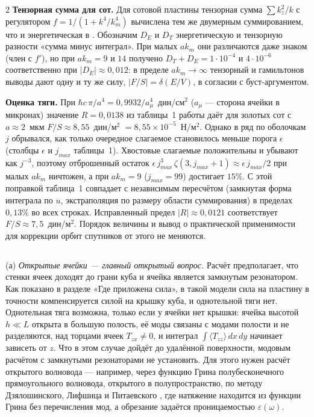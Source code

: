 \documentclass[twoside, 10pt]{article}
\def\myvspacebeforesubsection{-2.0mm}
\def\myvspaceaftersubsection{-2.5mm}
\begin{document}
\begin{multicols}{2}
\textbf{Тензорная сумма для сот.} Для сотовой пластины тензорная сумма \(\sum k_z^2/k\) с
регулятором \(f=1/(1+k^4/k_m^4)\) вычислена тем же двумерным суммированием, что и энергетическая
в \cite{Drozdov2024}. Обозначим \(D_E\) и \(D_T\) энергетическую и тензорную разности
«сумма минус интеграл». При малых \(ak_m\) они различаются даже знаком (член с \(f'\)), но при
\(ak_m=9\) и \(14\) получено \(D_T+D_E=1\cdot10^{-4}\) и \(4\cdot10^{-6}\) соответственно при
\(|D_E|\approx0{,}012\): в пределе \(ak_m\to\infty\) тензорный и гамильтонов выводы дают одну и
ту же силу, \(|F/S|=\delta(E/V)\), в согласии с буст-аргументом.

\textbf{Оценка тяги.} При \(\hbar c\,\pi/a^4=0{,}9932/a_\mu^4\)~дин/см\(^2\) (\(a_\mu\) --- сторона
ячейки в микронах) значение \(R=0{,}0138\) из таблицы~1 работы \cite{Drozdov2024} даёт для
золотых сот с \(a\approx2\)~мкм \(F/S\approx8{,}55\)~дин/м\(^2\)
\(=8{,}55\times10^{-5}\)~Н/м\(^2\). Однако в \cite{Drozdov2024} ряд по оболочкам \(j\) обрывался, как только
очередное слагаемое становилось меньше порога \(\epsilon\) (столбцы \(\epsilon\) и \(j_{max}\)
таблицы~1). Хвостовые слагаемые положительны и убывают как \(j^{-3}\), поэтому отброшенный остаток
\(\epsilon\,j_{max}^3\,\zeta(3,j_{max}+1)\approx\epsilon\,j_{max}/2\) при малых \(ak_m\) ничтожен, а
при \(ak_m=9\) (\(j_{max}=99\)) достигает \(15\%\). С этой поправкой таблица~1 совпадает с независимым
пересчётом (замкнутая форма интеграла по \(u\), экстраполяция по размеру области суммирования)
в пределах \(0{,}13\%\) во всех строках. Исправленный предел \(|R|\approx0{,}0121\) соответствует
\(F/S\approx7{,}5\)~дин/м\(^2\). Порядок величины и вывод о практической применимости для
коррекции орбит спутников от этого не меняются.

\vspace{\myvspacebeforesubsection}
\subsection*{}
\vspace{\myvspaceaftersubsection}


(а) \textit{Открытые ячейки --- главный открытый вопрос.} Расчёт предполагает, что стенки ячеек доходят до грани куба и ячейка является замкнутым резонатором. Как показано в разделе «Где приложена сила», в такой модели сила на пластину в точности компенсируется силой на крышку куба, и однотельной тяги нет. Однотельная тяга возможна, только если у ячейки нет крышки: ячейка высотой \(h\ll L\) открыта в большую полость, её моды связаны с модами полости и не разделяются, над торцами ячеек \(T_{zx}\neq0\), и интеграл \(\int\langle T_{zz}\rangle\,dx\,dy\) начинает зависеть от \(z\). Что в этом случае дойдёт до удалённой поверхности, модовым расчётом с замкнутыми резонаторами не установить. Для этого нужен расчёт открытого волновода --- например, через функцию Грина полубесконечного прямоугольного волновода, открытого в полупространство, по методу Дзялошинского, Лифшица и Питаевского \cite{DLP1961}, где натяжение находится из функции Грина без перечисления мод, а обрезание задаётся проницаемостью \(\varepsilon(\omega)\).


\end{multicols}
\end{document}
